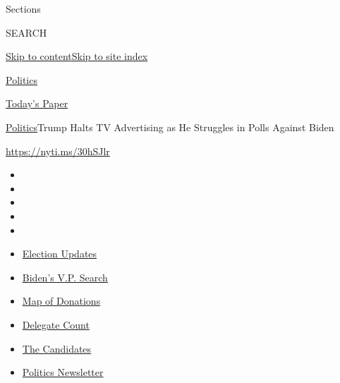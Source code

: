 Sections

SEARCH

\protect\hyperlink{site-content}{Skip to
content}\protect\hyperlink{site-index}{Skip to site index}

\href{https://www.nytimes.com/section/politics}{Politics}

\href{https://myaccount.nytimes.com/auth/login?response_type=cookie\&client_id=vi}{}

\href{https://www.nytimes.com/section/todayspaper}{Today's Paper}

\href{/section/politics}{Politics}\textbar{}Trump Halts TV Advertising
as He Struggles in Polls Against Biden

\url{https://nyti.ms/30hSJlr}

\begin{itemize}
\item
\item
\item
\item
\item
\end{itemize}

\begin{itemize}
\item
  \href{https://www.nytimes.com/2020/07/31/us/elections/biden-vs-trump.html?action=click\&pgtype=Article\&state=default\&region=TOP_BANNER\&context=storylines_menu}{Election
  Updates}
\item
  \href{https://www.nytimes.com/article/biden-vice-president-2020.html?action=click\&pgtype=Article\&state=default\&region=TOP_BANNER\&context=storylines_menu}{Biden's
  V.P. Search}
\item
  \href{https://www.nytimes.com/interactive/2020/07/24/us/politics/trump-biden-campaign-donors.html?action=click\&pgtype=Article\&state=default\&region=TOP_BANNER\&context=storylines_menu}{Map
  of Donations}
\item
  \href{https://www.nytimes.com/interactive/2020/us/elections/delegate-count-primary-results.html?action=click\&pgtype=Article\&state=default\&region=TOP_BANNER\&context=storylines_menu}{Delegate
  Count}
\item
  \href{https://www.nytimes.com/interactive/2019/us/politics/2020-presidential-candidates.html?action=click\&pgtype=Article\&state=default\&region=TOP_BANNER\&context=storylines_menu}{The
  Candidates}
\item
  \href{https://www.nytimes.com/newsletters/politics?action=click\&pgtype=Article\&state=default\&region=TOP_BANNER\&context=storylines_menu}{Politics
  Newsletter}
\end{itemize}

